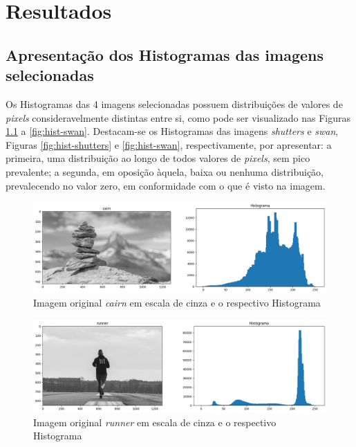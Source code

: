 \chapter[Resultados]{Resultados}

\section{Apresentação dos Histogramas das imagens selecionadas}

Os Histogramas das 4 imagens selecionadas possuem distribuições de valores de \textit{pixels} consideravelmente distintas entre si, como pode ser visualizado nas Figuras \ref{fig:hist-cairn} a \ref{fig:hist-swan}. Destacam-se os Histogramas das imagens \textit{shutters} e \textit{swan}, Figuras \ref{fig:hist-shutters} e  \ref{fig:hist-swan}, respectivamente, por apresentar: a primeira, uma distribuição ao longo de todos valores de \textit{pixels}, sem pico prevalente; a segunda, em oposição àquela, baixa ou nenhuma distribuição, prevalecendo no valor zero, em conformidade com o que é visto na imagem.

\begin{figure}
    \includegraphics[width=1\linewidth]{Elementos/Figuras/resultados-histograma-cairn.png}
    \caption{Imagem original \textit{cairn} em escala de cinza e o respectivo Histograma}
    \label{fig:hist-cairn}
\end{figure}

\begin{figure}
    \includegraphics[width=1\linewidth]{Elementos/Figuras/resultados-histograma-runner.png}
    \caption{Imagem original \textit{runner} em escala de cinza e o respectivo Histograma}
    \label{fig:hist-runner}
\end{figure}

